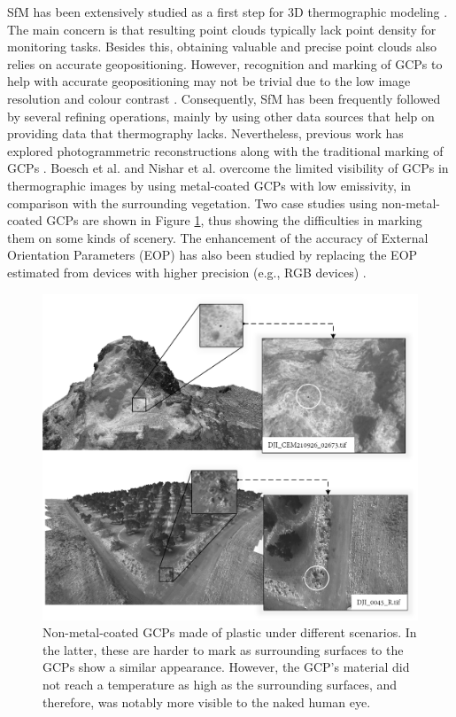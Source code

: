 SfM has been extensively studied as a first step for 3D thermographic modeling \cite{dahaghin_precise_2021, dahaghin_3d_2019, gonzalez_thermal_2019, grechi_3d_2021, webster_three-dimensional_2018, sledz_thermal_2018, kniaz_thermal_2018, hoegner_mobile_2018, zheng_thermal_2020, guilbert_fusion_2020}. The main concern is that resulting point clouds typically lack point density for monitoring tasks. Besides this, obtaining valuable and precise point clouds also relies on accurate geopositioning. However, recognition and marking of GCPs to help with accurate geopositioning may not be trivial due to the low image resolution and colour contrast \cite{sledz_thermal_2018}. Consequently, SfM has been frequently followed by several refining operations, mainly by using other data sources that help on providing data that thermography lacks. Nevertheless, previous work has explored photogrammetric reconstructions along with the traditional marking of GCPs \cite{dahaghin_precise_2021, gonzalez_thermal_2019, zheng_thermal_2020, sledz_thermal_2018}. Boesch et al. \cite{boesch_thermal_2017} and Nishar et al. \cite{nishar_thermal_2016} overcome the limited visibility of GCPs in thermographic images by using metal-coated GCPs with low emissivity, in comparison with the surrounding vegetation. Two case studies using non-metal-coated GCPs are shown in Figure \ref{fig:gcps_thermography}, thus showing the difficulties in marking them on some kinds of scenery. The enhancement of the accuracy of External Orientation Parameters (EOP) has also been studied by replacing the EOP estimated from devices with higher precision (e.g., RGB devices) \cite{jo_dense_2021}.

\begin{figure}[!ht]
	\includegraphics[width=\linewidth]{figs/context/gcps.png}
	\caption{Non-metal-coated GCPs made of plastic under different scenarios. In the latter, these are harder to mark as surrounding surfaces to the GCPs show a similar appearance. However, the GCP's material did not reach a temperature as high as the surrounding surfaces, and therefore, was notably more visible to the naked human eye. }
    \label{fig:gcps_thermography}
\end{figure}

